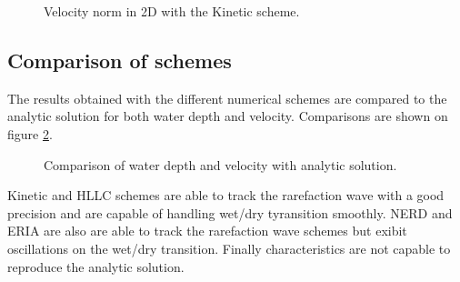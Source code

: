 \begin{figure}[H]
 \centering
  \caption{Velocity norm in 2D with the Kinetic scheme.}
  \label{fig:ritter:Ufirstobs1d}
\end{figure}

\subsection{Comparison of schemes}

The results obtained with the different numerical schemes are compared to the analytic solution for both
water depth and velocity. Comparisons are shown on figure \ref{fig:ritter:comparison}.

\begin{figure}[H]
\begin{minipage}[t]{0.5\textwidth}
 \centering
\end{minipage}%
\begin{minipage}[t]{0.5\textwidth}
 \centering
\end{minipage}
\begin{minipage}[t]{0.5\textwidth}
 \centering
\end{minipage}%
\begin{minipage}[t]{0.5\textwidth}
 \centering
\end{minipage}
\begin{minipage}[t]{0.5\textwidth}
 \centering
\end{minipage}%
\begin{minipage}[t]{0.5\textwidth}
 \centering
\end{minipage}
  \caption{Comparison of water depth and velocity with analytic solution.}
  \label{fig:ritter:comparison}
\end{figure}

Kinetic and HLLC schemes are able to track the rarefaction wave with a good precision and are capable of
handling wet/dry tyransition smoothly.
NERD and ERIA are also are able to track the rarefaction wave schemes
but exibit oscillations on the wet/dry transition.
Finally characteristics are not capable to reproduce the analytic solution.

